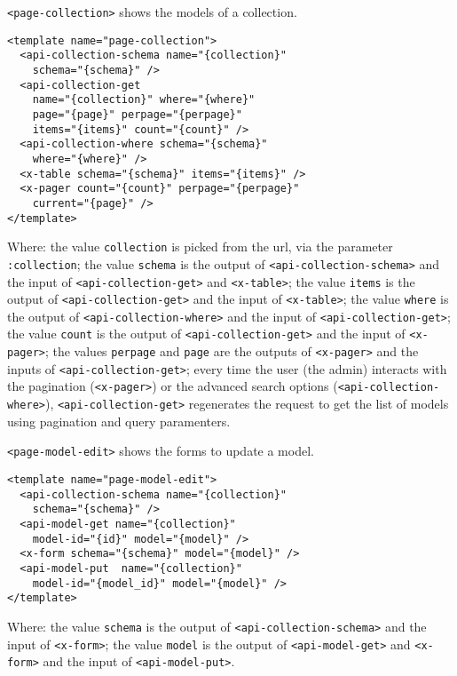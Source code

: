 \vspace{0.2cm}

\texttt{<page-collection>} shows the models of a collection.

\begin{lstlisting}[language=HTML5]
<template name="page-collection">
  <api-collection-schema name="{collection}"
    schema="{schema}" />
  <api-collection-get 
    name="{collection}" where="{where}" 
    page="{page}" perpage="{perpage}"  
    items="{items}" count="{count}" />
  <api-collection-where schema="{schema}"
    where="{where}" />
  <x-table schema="{schema}" items="{items}" />
  <x-pager count="{count}" perpage="{perpage}"
    current="{page}" />
</template>
\end{lstlisting}

Where: 
the value \texttt{collection} is picked from the url, via the parameter \texttt{:collection};
the value \texttt{schema} is the output of \texttt{<api-collection-schema>} and the input of \texttt{<api-collection-get>} and \texttt{<x-table>};
the value \texttt{items} is the output of \texttt{<api-collection-get>} and the input of \texttt{<x-table>};
the value \texttt{where} is the output of \texttt{<api-collection-where>} and the input of \texttt{<api-collection-get>};
the value \texttt{count} is the output of \texttt{<api-collection-get>} and the input of \texttt{<x-pager>};
the values \texttt{perpage} and \texttt{page} are the outputs of \texttt{<x-pager>} and the inputs of \texttt{<api-collection-get>};
every time the user (the admin) interacts with the pagination (\texttt{<x-pager>}) or the advanced search options (\texttt{<api-collection-where>}), \texttt{<api-collection-get>} regenerates the request to get the list of models using pagination and query paramenters.

\vspace{0.2cm}

\texttt{<page-model-edit>} shows the forms to update a model.

\begin{lstlisting}[language=HTML5]
<template name="page-model-edit">
  <api-collection-schema name="{collection}"
    schema="{schema}" />
  <api-model-get name="{collection}" 
    model-id="{id}" model="{model}" />
  <x-form schema="{schema}" model="{model}" />
  <api-model-put  name="{collection}"
    model-id="{model_id}" model="{model}" />
</template>
\end{lstlisting}

Where: 
the value \texttt{schema} is the output of \texttt{<api-collection-schema>} and the input of \texttt{<x-form>};
the value \texttt{model} is the output of \texttt{<api-model-get>} and \texttt{<x-form>} and the input of \texttt{<api-model-put>}.

